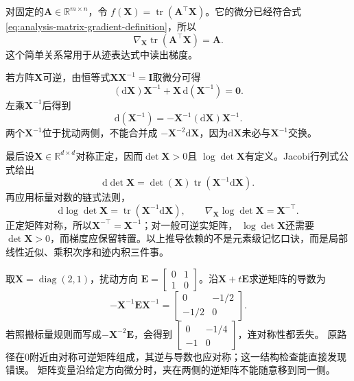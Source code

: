 对固定的$\bm{A}\in\mathbb{R}^{m\times n}$，令 $f(\bm{X})=\operatorname{tr}(\bm{A}^{\top}\bm{X})$。它的微分已经符合式
\eqref{eq:analysis-matrix-gradient-definition}，所以
\begin{equation}
  \nabla_{\bm{X}}\operatorname{tr}(\bm{A}^{\top}\bm{X})
  =\bm{A}.
\label{eq:analysis-trace-linear-gradient}
\end{equation}
这个简单关系常用于从迹表达式中读出梯度。

若方阵$\bm{X}$可逆，由恒等式$\bm{X}\bm{X}^{-1}=\bm{I}$取微分可得
\[   (\mathrm{d}\bm{X})\bm{X}^{-1}   +\bm{X}\,\mathrm{d}(\bm{X}^{-1})=\bm{0}. \]
左乘$\bm{X}^{-1}$后得到
\begin{equation}
  \mathrm{d}(\bm{X}^{-1})
  =
  -\bm{X}^{-1}(\mathrm{d}\bm{X})\bm{X}^{-1}.
\label{eq:analysis-inverse-differential}
\end{equation}
两个$\bm{X}^{-1}$位于扰动两侧，不能合并成 $-\bm{X}^{-2}\mathrm{d}\bm{X}$，因为$\mathrm{d}\bm{X}$未必与$\bm{X}^{-1}$交换。

最后设$\bm{X}\in\mathbb{R}^{d\times d}$对称正定，因而$\det\bm{X}>0$且 $\log\det\bm{X}$有定义。Jacobi行列式公式给出
\[   \mathrm{d}\det\bm{X}   =   \det(\bm{X})\operatorname{tr}   (\bm{X}^{-1}\mathrm{d}\bm{X}). \]
再应用标量对数的链式法则，
\begin{equation}
  \mathrm{d}\log\det\bm{X}
  =
  \operatorname{tr}(\bm{X}^{-1}\mathrm{d}\bm{X}),
  \qquad
  \nabla_{\bm{X}}\log\det\bm{X}
  =
  \bm{X}^{-\top}.
\label{eq:analysis-logdet-gradient}
\end{equation}
正定矩阵对称，所以$\bm{X}^{-\top}=\bm{X}^{-1}$；对一般可逆实矩阵， $\log\det\bm{X}$还需要$\det\bm{X}>0$，而梯度应保留转置。以上推导依赖的不是元素级记忆口诀，而是局部线性近似、乘积次序和迹内积三件事。
\begin{example}[逆矩阵微分中的乘法次序]
\label{ex:analysis-noncommuting-inverse-differential}
取$\bm X=\operatorname{diag}(2,1)$，扰动方向
$\bm E=\begin{bmatrix}0&1\\1&0\end{bmatrix}$。沿$\bm X+t\bm E$求逆矩阵的导数为
\[
 -\bm X^{-1}\bm E\bm X^{-1}
 =\begin{bmatrix}0&-1/2\\-1/2&0\end{bmatrix}.
\]
若照搬标量规则而写成$-\bm X^{-2}\bm E$，会得到
$\begin{bmatrix}0&-1/4\\-1&0\end{bmatrix}$，连对称性都丢失。
原路径在$0$附近由对称可逆矩阵组成，其逆与导数也应对称；这一结构检查能直接发现错误。
矩阵变量沿给定方向微分时，夹在两侧的逆矩阵不能随意移到同一侧。
\end{example}

